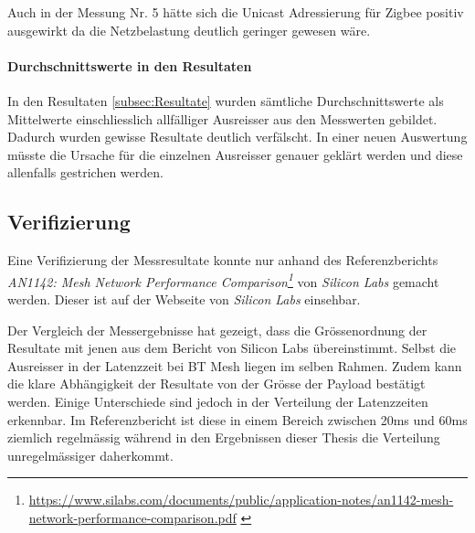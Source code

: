 Auch in der Messung Nr. 5 hätte sich die Unicast Adressierung für Zigbee positiv ausgewirkt da die Netzbelastung deutlich geringer gewesen wäre.
 
\paragraph{Durchschnittswerte in den Resultaten}
In den Resultaten \ref{subsec:Resultate} wurden sämtliche Durchschnittswerte als Mittelwerte einschliesslich allfälliger Ausreisser aus den Messwerten gebildet.
Dadurch wurden gewisse Resultate deutlich verfälscht.
In einer neuen Auswertung müsste die Ursache für die einzelnen Ausreisser genauer geklärt werden und diese allenfalls gestrichen werden.


\subsection{Verifizierung}\label{subsec:Verifizierung}
Eine Verifizierung der Messresultate konnte nur anhand des Referenzberichts \textit{AN1142: Mesh Network Performance
Comparison\footnote{\url{https://www.silabs.com/documents/public/application-notes/an1142-mesh-network-performance-comparison.pdf} \cite{silicon_laboratories_inc_an1142_2020}}} von \textit{Silicon Labs} gemacht werden.
Dieser ist auf der Webseite von \textit{Silicon Labs} einsehbar.

Der Vergleich der Messergebnisse hat gezeigt, dass die Grössenordnung der Resultate mit jenen aus dem Bericht von Silicon Labs übereinstimmt.
Selbst die Ausreisser in der Latenzzeit bei BT Mesh liegen im selben Rahmen.
Zudem kann die klare Abhängigkeit der Resultate von der Grösse der Payload bestätigt werden.
Einige Unterschiede sind jedoch in der Verteilung der Latenzzeiten erkennbar.
Im Referenzbericht ist diese in einem Bereich zwischen 20ms und 60ms ziemlich regelmässig während in den Ergebnissen dieser Thesis die Verteilung unregelmässiger daherkommt.






